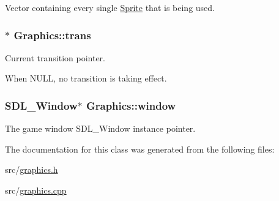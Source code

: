 Vector containing every single \hyperlink{class_sprite}{Sprite} that is being used. 

\hypertarget{class_graphics_a0e96d6ad5fd4a2546c2385f92e2ee12d}{
\subsubsection[{trans}]{$\ast$ Graphics\-::trans\hspace{0.3cm}{\ttfamily [protected]}}}\label{class_graphics_a0e96d6ad5fd4a2546c2385f92e2ee12d}


Current transition pointer. 

When N\-U\-L\-L, no transition is taking effect. \hypertarget{class_graphics_af397f61e26b41302b0b66ee4ab408952}{
\subsubsection[{window}]{\setlength{\rightskip}{0pt plus 5cm}S\-D\-L\-\_\-\-Window$\ast$ Graphics\-::window}}\label{class_graphics_af397f61e26b41302b0b66ee4ab408952}


The game window S\-D\-L\-\_\-\-Window instance pointer. 



The documentation for this class was generated from the following files\-:\begin{DoxyCompactItemize}
\item 
src/\hyperlink{graphics_8h}{graphics.\-h}\item 
src/\hyperlink{graphics_8cpp}{graphics.\-cpp}\end{DoxyCompactItemize}
